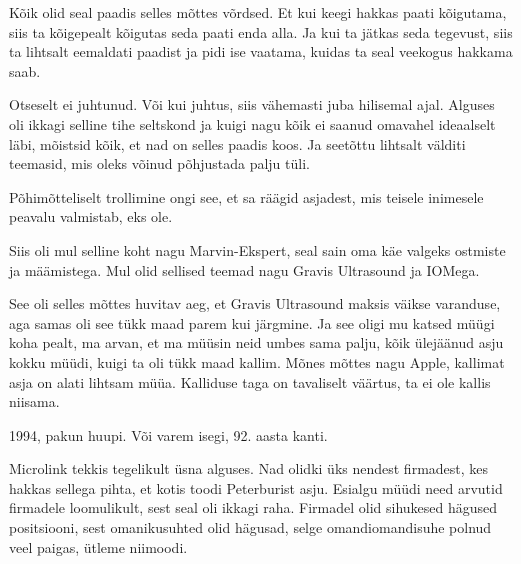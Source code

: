 
Kõik olid seal paadis selles mõttes võrdsed. Et kui keegi hakkas paati 
kõigutama, siis ta kõigepealt kõigutas seda paati enda alla. Ja kui ta jätkas 
seda tegevust, siis ta lihtsalt eemaldati paadist ja pidi ise vaatama, kuidas 
ta seal veekogus hakkama saab.


Otseselt ei juhtunud. Või kui juhtus, siis vähemasti juba hilisemal ajal. 
Alguses oli ikkagi selline tihe seltskond ja kuigi nagu kõik ei saanud omavahel 
ideaalselt läbi, mõistsid kõik, et nad on selles paadis  koos. Ja seetõttu 
lihtsalt välditi teemasid, mis oleks võinud põhjustada palju tüli.


Põhimõtteliselt trollimine ongi see, et sa räägid asjadest, mis teisele 
inimesele peavalu valmistab, eks ole.
                 

Siis oli mul selline koht nagu Marvin-Ekspert, seal sain oma käe valgeks 
ostmiste ja määmistega. Mul olid sellised teemad nagu Gravis Ultrasound ja 
IOMega.

See oli selles mõttes huvitav aeg, et Gravis Ultrasound maksis väikse 
varanduse, aga samas oli see tükk maad parem kui järgmine. Ja see oligi mu 
katsed müügi koha pealt, ma arvan, et ma müüsin neid umbes sama palju, kõik 
ülejäänud asju kokku müüdi, kuigi ta oli tükk maad kallim. Mõnes mõttes nagu 
Apple, kallimat asja on alati lihtsam müüa. Kalliduse taga on tavaliselt 
väärtus, ta ei ole kallis niisama.


1994, pakun huupi. Või varem isegi, 92. aasta kanti.


Microlink tekkis tegelikult üsna alguses. Nad olidki üks nendest firmadest, kes 
hakkas sellega pihta, et kotis toodi Peterburist asju. Esialgu müüdi need 
arvutid firmadele loomulikult, sest seal oli ikkagi raha. Firmadel olid 
sihukesed hägused positsiooni, sest omanikusuhted olid hägusad, selge 
omandiomandisuhe polnud veel paigas, ütleme niimoodi.


